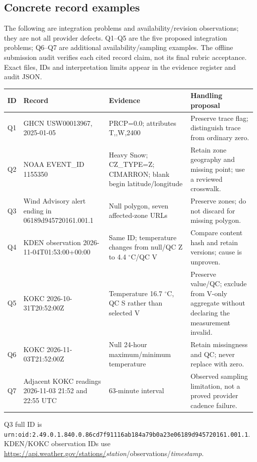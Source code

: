 \subsection{Concrete record examples}
The following are integration problems and availability/revision observations;
they are not all provider defects. Q1--Q5 are the five proposed integration
problems; Q6--Q7 are additional availability/sampling examples. The offline submission audit
verifies each cited record claim, not its final rubric acceptance. Exact files,
IDs and interpretation limits appear in the evidence register and audit JSON.
\begin{longtable}{L{1cm}L{4.6cm}L{4.5cm}L{4.8cm}}
\toprule ID & Record & Evidence & Handling proposal \\
\midrule\endhead
Q1 & GHCN USW00013967, 2025-01-05 & PRCP=0.0; attributes T,,W,2400 & Preserve trace flag; distinguish trace from ordinary zero. \\
Q2 & NOAA EVENT\_ID 1155350 & Heavy Snow; CZ\_TYPE=Z; CIMARRON; blank begin latitude/longitude & Retain zone geography and missing point; use a reviewed crosswalk. \\
Q3 & Wind Advisory alert ending in 06189d945720161.001.1 & Null polygon, seven affected-zone URLs & Preserve zones; do not discard for missing polygon. \\
Q4 & KDEN observation 2026-11-04T01:53:00+00:00 & Same ID; temperature changes from null/QC Z to 4.4 $^{\circ}$C/QC V & Compare content hash and retain versions; cause is unproven. \\
Q5 & KOKC 2026-10-31T20:52:00Z & Temperature 16.7 $^{\circ}$C, QC S rather than selected V & Preserve value/QC; exclude from V-only aggregate without declaring the measurement invalid. \\
Q6 & KOKC 2026-11-03T21:52:00Z & Null 24-hour maximum/minimum temperature & Retain missingness and QC; never replace with zero. \\
Q7 & Adjacent KOKC readings 2026-11-03 21:52 and 22:55 UTC & 63-minute interval & Observed sampling limitation, not a proved provider cadence failure. \\
\bottomrule
\end{longtable}
Q3 full ID is \nolinkurl{urn:oid:2.49.0.1.840.0.86cd7f91116ab184a79b0a23e06189d945720161.001.1}.
KDEN/KOKC observation IDs use
\url{https://api.weather.gov/stations/}\emph{station}/observations/\emph{timestamp}.




